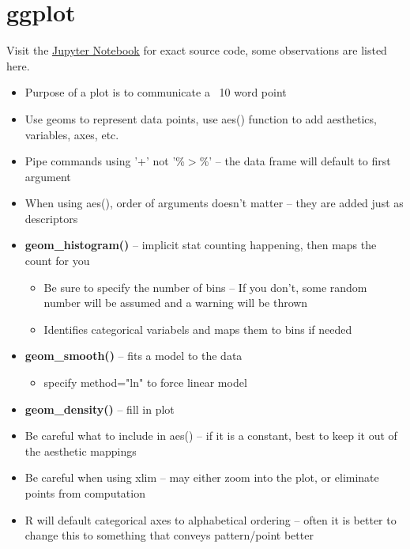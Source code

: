 \section{ggplot}
Visit the \href{https://github.com/jhofman/msd2017/blob/master/lectures/lecture_5/visualization_with_ggplot2.ipynb}{\underline{Jupyter Notebook}} for exact source code, some observations are listed here.
\begin{itemize}
    \item Purpose of a plot is to communicate a ~10 word point 
    \item Use geoms to represent data points, use aes() function to add aesthetics, variables, axes, etc. 
    \item Pipe commands using '+' not '\%$>$\%' -- the data frame will default to first argument
    \item When using aes(), order of arguments doesn't matter -- they are added just as descriptors
    \item \textbf{geom\_histogram()} -- implicit stat counting happening, then maps the count for you
    \begin{itemize}
        \item Be sure to specify the number of bins -- If you don't, some random number will be assumed and a warning will be thrown    
        \item Identifies categorical variabels and maps them to bins if needed
    \end{itemize}
    \item \textbf{geom\_smooth()} -- fits a model to the data
    \begin{itemize}
        \item specify method="ln" to force linear model
    \end{itemize}
    \item \textbf{geom\_density()} -- fill in plot
    \item Be careful what to include in aes() -- if it is a constant, best to keep it out of the aesthetic mappings
    \item Be careful when using xlim -- may either zoom into the plot, or eliminate points from computation
    \item R will default categorical axes to alphabetical ordering -- often it is better to change this to something that conveys pattern/point better
\end{itemize}
